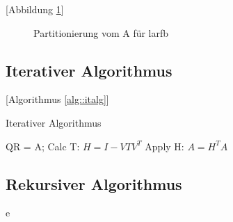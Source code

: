 [Abbildung \ref{fig:patrA}]
\begin{figure} 
	\centering
	
	\caption{Partitionierung vom A für larfb}
	\label{fig:patrA}
\end{figure}


\subsection{Iterativer Algorithmus}
[Algorithmus \ref{alg::italg}]
\begin{algorithm}
	\caption{Iterativer Algorithmus}
	\label{alg::italg}
	\begin{algorithmic}
			\State QR = A;
				\State Calc T: $H=I-VTV^T$
				\State Apply H: $A=H^TA$
			\EndIf
		\EndFor
	\end{algorithmic}
\end{algorithm}


\subsection{Rekursiver Algorithmus}


e
